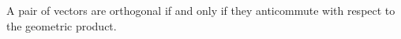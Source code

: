 \begin{corollary}\label{c:orthogonality}
	A pair of vectors are orthogonal if and only if they anticommute with respect to the geometric product.
\end{corollary}

